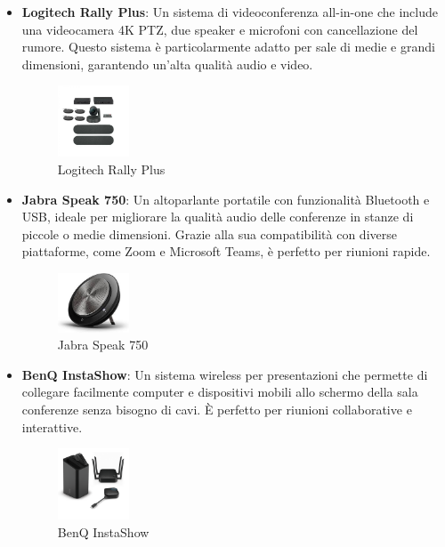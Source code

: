 \documentclass{assignment}
\begin{document}
\begin{itemize}
    \item \textbf{Logitech Rally Plus}: Un sistema di videoconferenza all-in-one che include una videocamera 4K PTZ, due speaker e microfoni con cancellazione del rumore. Questo sistema è particolarmente adatto per sale di medie e grandi dimensioni, garantendo un'alta qualità audio e video.
    \begin{figure}[H]
        \centering
        \includegraphics[width=0.2\textwidth]{assets/logitech_rally_plus.jpg}
        \caption{Logitech Rally Plus}
    \end{figure}

    \item \textbf{Jabra Speak 750}: Un altoparlante portatile con funzionalità Bluetooth e USB, ideale per migliorare la qualità audio delle conferenze in stanze di piccole o medie dimensioni. Grazie alla sua compatibilità con diverse piattaforme, come Zoom e Microsoft Teams, è perfetto per riunioni rapide.
    \begin{figure}[H]
        \centering
        \includegraphics[width=0.2\textwidth]{assets/jabra_speak_750.jpg}
        \caption{Jabra Speak 750}
    \end{figure}

    \item \textbf{BenQ InstaShow}: Un sistema wireless per presentazioni che permette di collegare facilmente computer e dispositivi mobili allo schermo della sala conferenze senza bisogno di cavi. È perfetto per riunioni collaborative e interattive.
    \begin{figure}[H]
        \centering
        \includegraphics[width=0.2\textwidth]{assets/benq_instashow.png}
        \caption{BenQ InstaShow}
    \end{figure}


\end{itemize}
\end{document}
